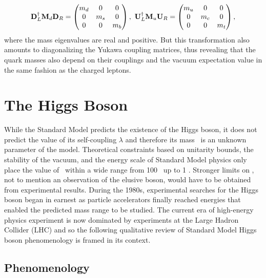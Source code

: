 \begin{equation}
  \mathbf{D}_{L}^{\dag}\mathbf{M}_{\qrkd}\mathbf{D}_{R} = \begin{pmatrix} m_{\qrkd} & 0 & 0 \\ 0 & m_{\qrks} & 0 \\ 0 & 0 & m_{\qrkb} \\ \end{pmatrix},\ \mathbf{U}_{L}^{\dag}\mathbf{M}_{\qrku}\mathbf{U}_{R} = \begin{pmatrix} m_{\qrku} & 0 & 0 \\ 0 & m_{\qrkc} & 0 \\ 0 & 0 & m_{\qrkt} \\ \end{pmatrix},
\end{equation}
where the mass eigenvalues are real and positive. But this transformation also amounts to diagonalizing the Yukawa coupling matrices, thus revealing that the quark masses also depend on their couplings and the vacuum expectation value in the same fashion as the charged leptons.

\section{The Higgs Boson}

While the Standard Model predicts the existence of the Higgs boson, it does not predict the value of its self-coupling $\lambda$ and therefore its mass \massH\ is an unknown parameter of the model. Theoretical constraints based on unitarity bounds, the stability of the vacuum, and the energy scale of Standard Model physics only place the value of \massH\ within a wide range from 100 \GeV\ up to 1 \TeV. Stronger limits on \massH, not to mention an observation of the elusive boson, would have to be obtained from experimental results. During the 1980s, experimental searches for the Higgs boson began in earnest as particle accelerators finally reached energies that enabled the predicted mass range to be studied. The current era of high-energy physics experiment is now dominated by experiments at the Large Hadron Collider (LHC) and so the following qualitative review of Standard Model Higgs boson phenomenology is framed in its context.

\subsection{Phenomenology}

